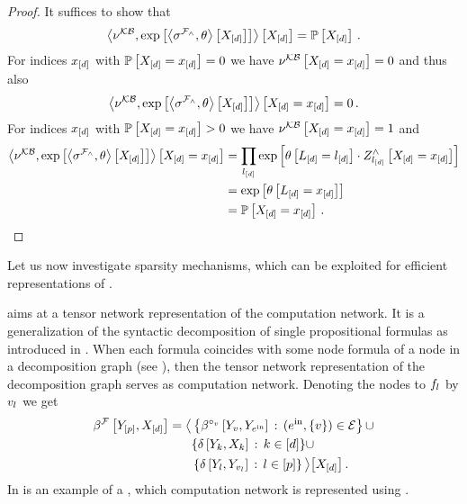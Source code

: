 \begin{proof}
    It suffices to show that
    \[ \left\langle \nu^{\mathcal{KB}}, \mathrm{exp}\left[\left\langle 
        \sigma^{\mathcal{F}_{\land}},\theta
    \right\rangle \left[ 
        X_{[d]}
     \right]\right]\right\rangle \left[ X_{[d]} \right] = \mathbb{P}\left[X_{[d]}\right] \, . \]
    For indices $x_{[d]}$ with $\mathbb{P}\left[X_{[d]}=x_{[d]}\right]=0$ we have $\nu^{\mathcal{KB}}\left[X_{[d]}=x_{[d]}\right]=0$ and thus also
    \[ \left\langle \nu^{\mathcal{KB}}, \mathrm{exp}\left[\left\langle 
        \sigma^{\mathcal{F}_{\land}},\theta
    \right\rangle \left[ 
        X_{[d]}
     \right]\right]\right\rangle \left[ X_{[d]}=x_{[d]} \right] = 0 \, . \]
    For indices $x_{[d]}$ with $\mathbb{P}\left[X_{[d]}=x_{[d]}\right]>0$ we have $\nu^{\mathcal{KB}}\left[X_{[d]}=x_{[d]}\right]=1$ and
    \begin{align*}
        \left\langle \nu^{\mathcal{KB}}, \mathrm{exp}\left[\left\langle 
            \sigma^{\mathcal{F}_{\land}},\theta
        \right\rangle \left[ 
            X_{[d]}
         \right]\right]\right\rangle \left[ X_{[d]}=x_{[d]} \right]
        &= \prod_{l_{[d]}} \mathrm{exp}\left[\theta\left[L_{[d]}=l_{[d]}\right] \cdot Z^{\land}_{l_{[d]}}\left[X_{[d]}=x_{[d]}\right]\right] \\
        &=  \mathrm{exp}\left[\theta\left[L_{[d]}=x_{[d]}\right]\right] \\
        &=  \mathbb{P}\left[X_{[d]}=x_{[d]}\right] \, .
    \end{align*}
\end{proof}



Let us now investigate sparsity mechanisms, which can be exploited for efficient representations of \HybridLogicNetworks{}.

\subsect{\DecompositionSparsity{}}

\DecompositionSparsity{} aims at a tensor network representation of the computation network.
It is a generalization of the syntactic decomposition of single propositional formulas as introduced in .
When each formula coincides with some node formula of a node in a decomposition graph (see ), then the tensor network representation of the decomposition graph serves as computation network.
Denoting the nodes to $f_{l}$ by $v_l$ we get
\begin{align*}
    \beta^{\mathcal{F}}\left[Y_{[p]},X_{[d]}\right] =
    \big\langle 
        &\left\{
        \beta^{\circ_{v}}\left[Y_{v},Y_{e^{\mathrm{in}}}\right] \,:\, (e^{\mathrm{in}},\{v\})\in\mathcal{E}
        \right\} \cup \\
        & \{\delta\left[Y_{k},X_{k}\right] \,:\, k\in[d]\} \cup \\
        &\left\{
        \delta\left[Y_{l},Y_{v_{l}}\right] \,:\, l\in[p]
        \right\}
     \big\rangle \big[ X_{[d]} \big] \, .
\end{align*}
In  is an example of a \HybridLogicNetwork{}, which computation network is represented using \decompositionSparsity{}.


